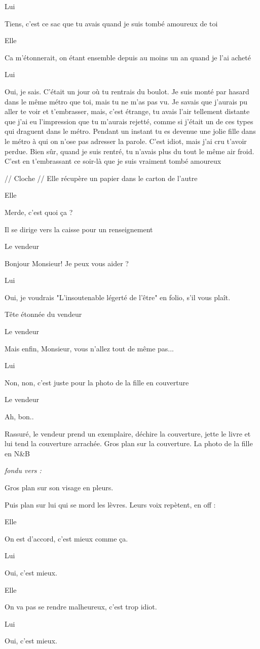 \documentclass{screenplay}
\newcommand{\speak}[2]{
\begin{dialogue}{#1}
#2
\end{dialogue}
}
\begin{document}
\speak{Lui}{
Tiens, c'est ce sac que tu avais quand je suis tombé amoureux de toi
}
\speak{Elle}{
Ca m'étonnerait, on étant ensemble depuis au moins un an quand je l'ai acheté
}
\speak{Lui}{
Oui, je sais. C'était un jour où tu rentrais du boulot. Je suis monté par hasard dans le même métro que toi, mais tu ne m'as pas vu. Je savais que j'aurais pu aller te voir et t'embrasser, mais, c'est étrange, tu avais l'air tellement distante que j'ai eu l'impression que tu m'aurais rejetté, comme si j'était un de ces types qui draguent dans le métro. Pendant un instant tu es devenue une jolie fille dans le métro à qui on n'ose pas adresser la parole. C'est idiot, mais j'ai cru t'avoir perdue.
Bien sûr, quand je suis rentré, tu n'avais plus du tout le même air froid. C'est en t'embrassant ce soir-là que je suis vraiment tombé amoureux
}

// Cloche //
\temps
Elle récupère un papier dans le carton de l'autre
\speak{Elle}{
Merde, c'est quoi ça ?
}

Il se dirige vers la caisse pour un renseignement
\speak{Le vendeur}{
Bonjour Monsieur! Je peux vous aider ?
}
\speak{Lui}{
Oui, je voudrais "L'insoutenable légerté de l'être" en folio, s'il vous plaît.
}
Tête étonnée du vendeur
\speak{Le vendeur}{
Mais enfin, Monsieur, vous n'allez tout de même pas...
}
\speak{Lui}{
Non, non, c'est juste pour la photo de la fille en couverture
}
\speak{Le vendeur}{
Ah, bon..
}
Rassuré, le vendeur prend un exemplaire, déchire la couverture, jette le livre et lui tend la couverture arrachée. Gros plan sur la couverture. La photo de la fille en N\&B

\textit{fondu vers :}


Gros plan sur son visage en pleurs.

Puis plan sur lui qui se mord les lèvres. Leurs voix repètent, en off :


\speak{Elle}{
On est d'accord, c'est mieux comme ça.
}
\speak{Lui}{
Oui, c'est mieux.
}
\speak{Elle}{
On va pas se rendre malheureux, c'est trop idiot.
}
\speak{Lui}{
Oui, c'est mieux.
}
\end{document}
